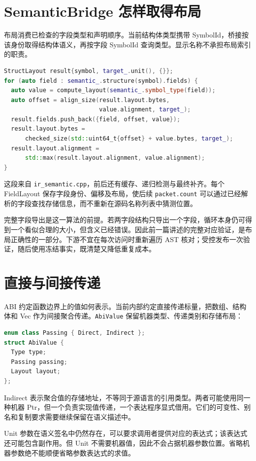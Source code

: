 \section{SemanticBridge 怎样取得布局}
布局消费已检查的字段类型和声明顺序。当前结构体类型携带 SymbolId，桥接按该身份取得结构体语义，再按字段 SymbolId 查询类型。显示名称不承担布局索引的职责。
\begin{lstlisting}[language=C++,caption={当前结构体布局计算的核心节选}]
StructLayout result{symbol, target_.unit(), {}};
for (auto field : semantic_.structure(symbol).fields) {
  auto value = compute_layout(semantic_.symbol_type(field));
  auto offset = align_size(result.layout.bytes,
                           value.alignment, target_);
  result.fields.push_back({field, offset, value});
  result.layout.bytes =
      checked_size(std::uint64_t{offset} + value.bytes, target_);
  result.layout.alignment =
      std::max(result.layout.alignment, value.alignment);
}
\end{lstlisting}
这段来自 \texttt{ir\_semantic.cpp}，前后还有缓存、递归检测与最终补齐。每个 FieldLayout 保存字段身份、偏移及布局，使后续 \texttt{packet.count} 可以通过已经解析的字段查找存储信息，而不重新在源码名称列表中猜测位置。

完整字段导出是这一算法的前提。若两字段结构只导出一个字段，循环本身仍可得到一个看似合理的大小，但含义已经错误。因此前一篇讲述的完整对应验证，是布局正确性的一部分。下游不宜在每次访问时重新遍历 AST 核对；受控发布一次验证，随后使用冻结事实，既清楚又降低重复成本。

\section{直接与间接传递}
ABI 约定函数边界上的值如何表示。当前内部约定直接传递标量，把数组、结构体和 Vec 作为间接聚合传递。\texttt{AbiValue} 保留机器类型、传递类别和存储布局：
\begin{lstlisting}[language=C++,caption={当前内部 ABI 的值描述}]
enum class Passing { Direct, Indirect };
struct AbiValue {
  Type type;
  Passing passing;
  Layout layout;
};
\end{lstlisting}
Indirect 表示聚合值的存储地址，不等同于源语言的引用类型。两者可能使用同一种机器 Ptr，但一个负责实现值传递，一个表达程序显式借用。它们的可变性、别名和复制要求需要继续保留在语义描述中。

Unit 参数在语义签名中仍然存在，可以要求调用者提供对应的表达式；该表达式还可能包含副作用。但 Unit 不需要机器值，因此不会占据机器参数位置。省略机器参数绝不能顺便省略参数表达式的求值。

